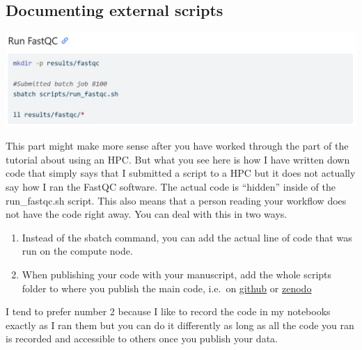 \documentclass[
  letterpaper,
  DIV=11,
  numbers=noendperiod]{scrreprt}
\providecommand{\tightlist}{%
  \setlength{\itemsep}{0pt}\setlength{\parskip}{0pt}}\usepackage{longtable,booktabs,array}
\begin{document}
\subsection{Documenting external
scripts}\label{documenting-external-scripts}

\includegraphics[width=5.82292in,height=\textheight]{../img/external_scripts.png}

This part might make more sense after you have worked through the part
of the tutorial about using an HPC. But what you see here is how I have
written down code that simply says that I submitted a script to a HPC
but it does not actually say how I ran the FastQC software. The actual
code is ``hidden'' inside of the run\_fastqc.sh script. This also means
that a person reading your workflow does not have the code right away.
You can deal with this in two ways.

\begin{enumerate}
\def\labelenumi{\arabic{enumi}.}
\tightlist
\item
  Instead of the sbatch command, you can add the actual line of code
  that was run on the compute node.
\item
  When publishing your code with your manuscript, add the whole scripts
  folder to where you publish the main code, i.e.~on
  \href{https://github.com/ndombrowski/cli_workshop/tree/main/example_doc}{github}
  or \href{https://zenodo.org/records/3839790}{zenodo}
\end{enumerate}

I tend to prefer number 2 because I like to record the code in my
notebooks exactly as I ran them but you can do it differently as long as
all the code you ran is recorded and accessible to others once you
publish your data.
\end{document}
